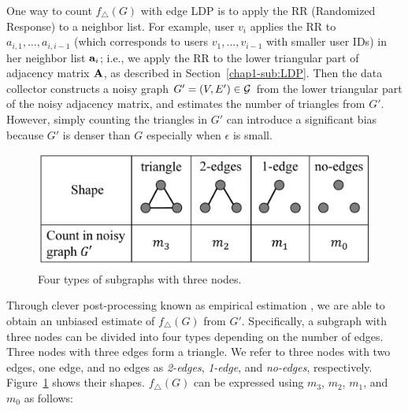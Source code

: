 One way to count $f_\triangle(G)$ with edge LDP is 
to apply the RR (Randomized Response) 
to a neighbor list. 
For example, user $v_i$ applies the RR to 
$a_{i,1}, \ldots, a_{i,i-1}$ (which corresponds to users $v_1, \ldots, v_{i-1}$ with smaller user IDs) in her neighbor list $\mathbf{a}_i$; i.e., 
we apply the RR to the lower triangular part of adjacency matrix $\mathbf{A}$, as described in Section~\ref{chap1-sub:LDP}. 
Then the data collector constructs a noisy graph $G'=(V,E') \in \mathcal{G}$ from the lower triangular part of the noisy adjacency matrix, and 
estimates the number of triangles 
from $G'$. 
However, 
simply counting
the triangles in 
$G'$ 
can introduce a significant bias 
because $G'$ is denser than $G$ especially when $\epsilon$ is small. 

\begin{figure}
\centering
\includegraphics[width=0.9\linewidth]{fig/triplet_shape.pdf}
\caption{Four types of subgraphs with three nodes.}
\label{chap1-fig:triplet_shape}
\end{figure}

Through 
clever post-processing 
known as 
empirical estimation 
\cite{Kairouz_ICML16,Murakami_USENIX19,Wang_USENIX17},
we are able to obtain an unbiased estimate of $f_\triangle(G)$ 
from $G'$. 
Specifically, a subgraph with three nodes can be divided into four types depending on the number of edges. 
Three nodes with three edges form a triangle. 
We refer to three nodes with two edges, one edge, and no edges as \textit{2-edges},  \textit{1-edge}, and  \textit{no-edges}, respectively. 
Figure~\ref{chap1-fig:triplet_shape} shows their shapes. 
$f_\triangle(G)$ can be expressed using $m_3$, $m_2$, $m_1$, and $m_0$ as follows:

